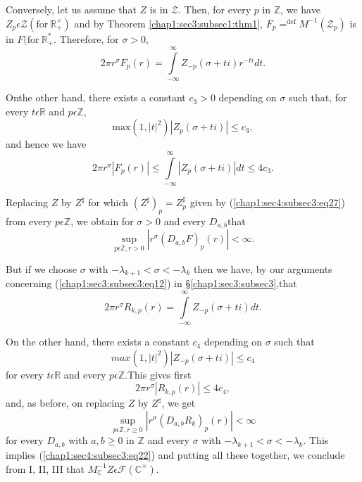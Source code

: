  Conversely, let us assume that $Z$ is in $\mathscr{Z}$. Then, for
 every $p$ in $\mathbb{Z}$, we have $Z_{p}\epsilon \mathscr{Z}(\text{for}~
 \mathbb{R}_{+}^\times)$ and by Theorem \ref{chap1:sec3:subsec1:thm1},
 $F_{p}{\displaystyle\mathop{=}^{\text{def}}}M^{-1}(\mathscr{Z}_{p})$
 is in $F(\text{for}~ \mathbb{R}_+^*$. Therefore,
 for $\sigma > 0$, 
\begin{equation*}
  2\pi r^{\sigma}F_{p}(r)=\int\limits_{-\infty}^{\infty}Z_{-p}(\sigma
  + ti)r^{-ti}dt. 
\end{equation*}

On\pageoriginale the other hand, there exists a constant $c_{3}>0$ depending on
$\sigma$ such that, for every $t\epsilon \mathbb{R}$ and $p\epsilon
\mathbb{Z}$,
\begin{equation*}
\text{max}(1,|t|^{2})|Z_{p}(\sigma+ti)|\le c_{3},
\end{equation*}
and hence we have 
\begin{equation*}
2\pi
r^{\sigma}|F_{p}(r)|\le\int\limits_{-\infty}^{\infty}|Z_{p}(\sigma+ti)|dt
\le 4c_{3}.
\end{equation*}

Replacing $Z$ by $Z^{\sharp}$ for which
$(Z^{\sharp})_{p}=Z_{p}^{\sharp}$ given by
(\ref{chap1:sec4:subsec3:eq27}) from every $p 
\epsilon \mathbb{Z}$, we obtain for $\sigma>0$ and every
$D_{a,b}$that 
\begin{equation*}
  {\displaystyle{\mathop{\sup}_{p\epsilon \mathbb{Z},r>0}}}
  |r^\sigma(D_{a,b}F)_{p}(r)|<\infty.
\end{equation*}

But if we choose $\sigma$ with $-\lambda_{k+1}<\sigma <-\lambda_{k}$
then we have, by our arguments concerning (\ref{chap1:sec3:subsec3:eq12}) in
\S \ref{chap1:sec3:subsec3},that
\begin{equation*}
2\pi r^{\sigma}R_{k,p}(r)=\int\limits_{-\infty}^{\infty}Z_{-p}(\sigma+ti)dt.
\end{equation*}

On the other hand, there exists a constant $c_{4}$ depending on
$\sigma$ such that 
\begin{equation*}
max(1,|t|^{2})|Z_{-p}(\sigma+ti)|\le c_{4}
\end{equation*}
for every $t\epsilon\mathbb{R}$ and every $p\epsilon\mathbb{Z}$.This
gives first
\begin{equation*}
2\pi r^{\sigma}|R_{k,p}(r)|\le4c_{4},
\end{equation*}
and, as before, on replacing  $Z$ by $Z^{\sharp}$, we get
\begin{equation*}
  {\displaystyle{\mathop{\sup}_{p\epsilon\mathbb{Z},r\ge
        0}}}|r^{\sigma}(D_{a,b} R_{k})_{p}(r)|<\infty 
\end{equation*}
for every $D_{a,b}$ with $a,b\ge 0$ in $\mathbb{Z}$ and every $\sigma$
with $-\lambda_{k+1}<\sigma<-\lambda_{k}$. This implies
(\ref{chap1:sec4:subsec3:eq22}) and
putting  all these together, we conclude from I, II, III that
$M_{\mathbb{C}}^{-1}Z\epsilon \mathscr{F}(\mathbb{C}^\times)$.

